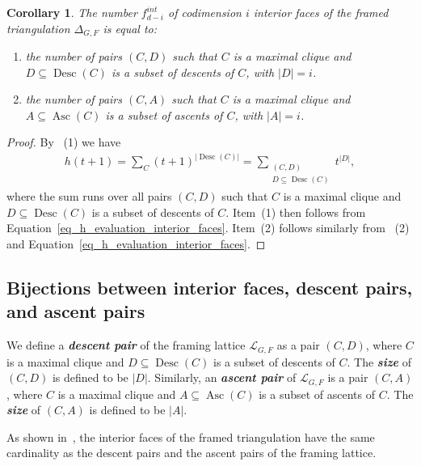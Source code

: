 \documentclass[12pt, reqno]{amsart}
\newcommand{\defn}[1]{{\color{blue!50!black}\textbf{\emph{#1}}}}
\newcommand{\desc}{\operatorname{desc}}
\newcommand{\Asc}{\operatorname{Asc}}
\newcommand{\Desc}{\operatorname{Desc}}
\theoremstyle{plain}
\newtheorem{corollary}[theorem]{Corollary}
\theoremstyle{definition}
\numberwithin{equation}{section}
\newcommand\scrL{\mathscr{L}}
\begin{document}
\begin{corollary}\label{cor_enumeration_interior_faces}
    The number $f_{d-i}^{int}$ of codimension $i$ interior faces of the framed triangulation $\Delta_{G,F}$ is equal to:
    \begin{enumerate}
        \item the number of pairs $(C,D)$ such that $C$ is a maximal clique and $D\subseteq \Desc(C)$ is a subset of descents of $C$, with $|D|=i$.
        \item the number of pairs $(C,A)$ such that $C$ is a maximal clique and $A\subseteq \Asc(C)$ is a subset of ascents of $C$, with $|A|=i$.
    \end{enumerate}
\end{corollary}
\begin{proof}
    By~ (1) we have
    \begin{align*}
    h(t+1) = \sum_C (t+1)^{|\Desc(C)|}     = \sum_{\substack{(C,D)\\ D\subseteq \Desc(C)}} t^{|D|},
    \end{align*}
    where the sum runs over all pairs $(C,D)$ such that $C$ is a maximal clique and $D\subseteq \Desc(C)$ is a subset of descents of $C$. Item~(1) then follows from Equation~\eqref{eq_h_evaluation_interior_faces}. Item~(2) follows similarly from~ (2) and Equation~\eqref{eq_h_evaluation_interior_faces}.
\end{proof}

\subsection{Bijections between interior faces, descent pairs, and ascent pairs}

We define a \defn{descent pair} of the framing lattice $\scrL_{G,F}$ as a pair $(C,D)$, where $C$ is a maximal clique and $D \subseteq \Desc(C)$ is a subset of descents of $C$. The \defn{size} of $(C,D)$ is defined to be $|D|$. Similarly, an \defn{ascent pair} of $\scrL_{G,F}$ is a pair $(C,A)$, where $C$ is a maximal clique and $A \subseteq \Asc(C)$ is a subset of ascents of $C$. The \defn{size} of $(C,A)$ is defined to be $|A|$.

As shown in~, the interior faces of the framed triangulation have the same cardinality as the descent pairs and the ascent pairs of the framing lattice.
\end{document}
